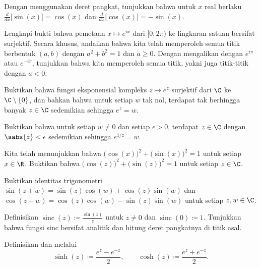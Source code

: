 \begin{exercise}
Dengan menggunakan deret pangkat, tunjukkan bahwa untuk $x$ real berlaku
$\frac{d}{dx} \bigl[ \sin(x)\bigr] = \cos(x)$ dan
$\frac{d}{dx} \bigl[ \cos(x)\bigr] = -\sin(x)$.
\end{exercise}

\begin{exercise}
Lengkapi bukti bahwa pemetaan $x \mapsto e^{ix}$ dari
$[0,2\pi)$ ke lingkaran satuan bersifat surjektif. Secara khusus, andaikan bahwa
kita telah memperoleh semua titik berbentuk $(a,b)$ dengan $a^2+b^2=1$ dan $a \geq 0$.
Dengan mengalikan dengan $e^{i\pi}$ atau $e^{-i\pi}$, tunjukkan bahwa kita memperoleh
semua titik, yakni juga titik-titik dengan $a < 0$.
\end{exercise}

\begin{exercise}
Buktikan bahwa fungsi eksponensial kompleks $z \mapsto e^z$ surjektif dari $\C$
ke $\C \setminus \{ 0 \}$, dan bahkan
bahwa untuk setiap $w$ tak nol, terdapat tak berhingga banyak $z \in \C$ sedemikian sehingga $e^z=w$.
\end{exercise}

\begin{exercise}
Buktikan bahwa untuk setiap $w \neq 0$ dan setiap $\epsilon > 0$,
terdapat $z \in \C$ dengan $\sabs{z} < \epsilon$ sedemikian sehingga $e^{1/z} = w$.
\end{exercise}

\begin{exercise}\label{exercise:cossinidentity}
Kita telah menunjukkan bahwa
${\bigl( \cos(x) \bigr)}^2 + {\bigl( \sin(x) \bigr)}^2 = 1$
untuk setiap $x \in \R$.
Buktikan bahwa
${\bigl( \cos(z) \bigr)}^2 + {\bigl( \sin(z) \bigr)}^2 = 1$
untuk setiap $z \in \C$.
\end{exercise}

\begin{exercise}
Buktikan identitas trigonometri
$\sin(z + w) = \sin(z) \cos(w) + \cos(z) \sin(w)$ dan
$\cos(z + w) = \cos(z) \cos(w) - \sin(z) \sin(w)$ untuk setiap $z,w \in \C$.
\end{exercise}

\begin{exercise}
Definisikan $\operatorname{sinc}(z) \coloneqq \frac{\sin(z)}{z}$ untuk $z \neq 0$ dan
$\operatorname{sinc}(0) \coloneqq 1$.
Tunjukkan bahwa fungsi sinc bersifat analitik dan hitung deret pangkatnya di titik asal.
\end{exercise}

\begin{exnote}
\pagebreak[2]
Definisikan \emph{} dan
\emph{} melalui
\begin{equation*}
\sinh(z) \coloneqq \frac{e^z-e^{-z}}{2}, \qquad
\cosh(z) \coloneqq \frac{e^z+e^{-z}}{2}.
\end{equation*}
\end{exnote}

